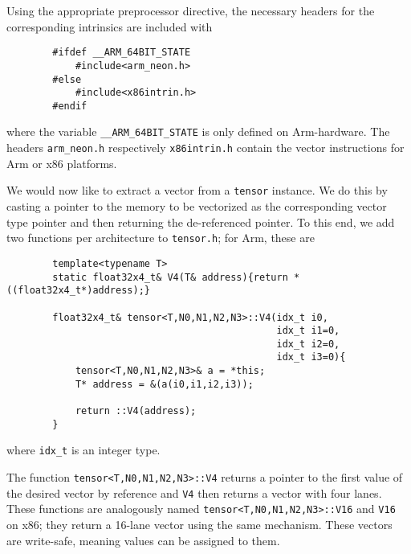 \documentclass{article}
\numberwithin{equation}{section}
\numberwithin{figure}{section}
\numberwithin{table}{section}
\begin{document}
    Using the appropriate preprocessor directive, the necessary headers for the corresponding intrinsics are included with

    \begin{verbatim}
        #ifdef __ARM_64BIT_STATE
            #include<arm_neon.h>
        #else
            #include<x86intrin.h>
        #endif
    \end{verbatim}

    where the variable \texttt{__ARM_64BIT_STATE} is only defined on Arm-hardware. The headers \texttt{arm\_neon.h}
    respectively \texttt{x86intrin.h} contain the vector instructions for Arm \cite{NEON:intrinsics} or x86
    \cite{Intel:intrinsics} platforms.

    We would now like to extract a vector from a \texttt{tensor} instance. We do this by casting a pointer to the
    memory to be vectorized as the corresponding vector type pointer and then returning the de-referenced pointer. To this
    end, we add two functions per architecture to \texttt{tensor.h}; for Arm, these are

    \begin{verbatim}
        template<typename T>
        static float32x4_t& V4(T& address){return *((float32x4_t*)address);}

        float32x4_t& tensor<T,N0,N1,N2,N3>::V4(idx_t i0,
                                               idx_t i1=0,
                                               idx_t i2=0,
                                               idx_t i3=0){
            tensor<T,N0,N1,N2,N3>& a = *this;
            T* address = &(a(i0,i1,i2,i3));

            return ::V4(address);
        }
    \end{verbatim}

    where \texttt{idx_t} is an integer type.

    The function \texttt{tensor<T,N0,N1,N2,N3>::V4} returns a pointer to the first value of the desired vector
    by reference and \texttt{V4} then returns a vector with four lanes. These functions are analogously named
    \texttt{tensor<T,N0,N1,N2,N3>::V16} and \texttt{V16} on x86; they return a 16-lane vector using the
    same mechanism. These vectors are write-safe, meaning values can be assigned to them.
    
\end{document}
